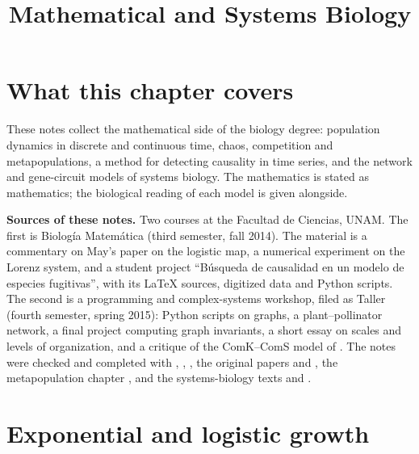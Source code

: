 



\title{Mathematical and Systems Biology}
\maketitle

\label{section-phantom}

\tableofcontents

\section{What this chapter covers}
\label{section-what-this-chapter-covers}

These notes collect the mathematical side of
the biology degree: population dynamics in
discrete and continuous time, chaos,
competition and metapopulations, a method
for detecting causality in time series, and
the network and gene-circuit models of
systems biology. The mathematics is stated
as mathematics; the biological reading of
each model is given alongside.

\textbf{Sources of these notes.}
Two courses at the Facultad de Ciencias,
UNAM. The first is Biolog\'ia Matem\'atica
(third semester, fall 2014). The material is
a commentary on May's paper on the
logistic map, a numerical experiment on
the Lorenz system, and a student project
``B\'usqueda de causalidad en un modelo de
especies fugitivas'', with its LaTeX sources,
digitized data and Python scripts. The
second is a programming and complex-systems
workshop, filed as Taller (fourth semester,
spring 2015): Python scripts on graphs, a
plant--pollinator network, a final project
computing graph invariants, a short essay on
scales and levels of organization, and a
critique of the ComK--ComS model of
\cite{suel2006excitable}. The notes were
checked and completed with
\cite{murray2002mathematical},
\cite{may1976simple},
\cite{strogatz1994nonlinear}, the original
papers \cite{armstrong1976fugitive} and
\cite{sugihara2012detecting}, the
metapopulation chapter
\cite{nee2007metapopulations}, and the
systems-biology texts
\cite{ideker2001new} and
\cite{stokes2007modeling}.

\section{Exponential and logistic growth}
\label{section-exponential-logistic}


